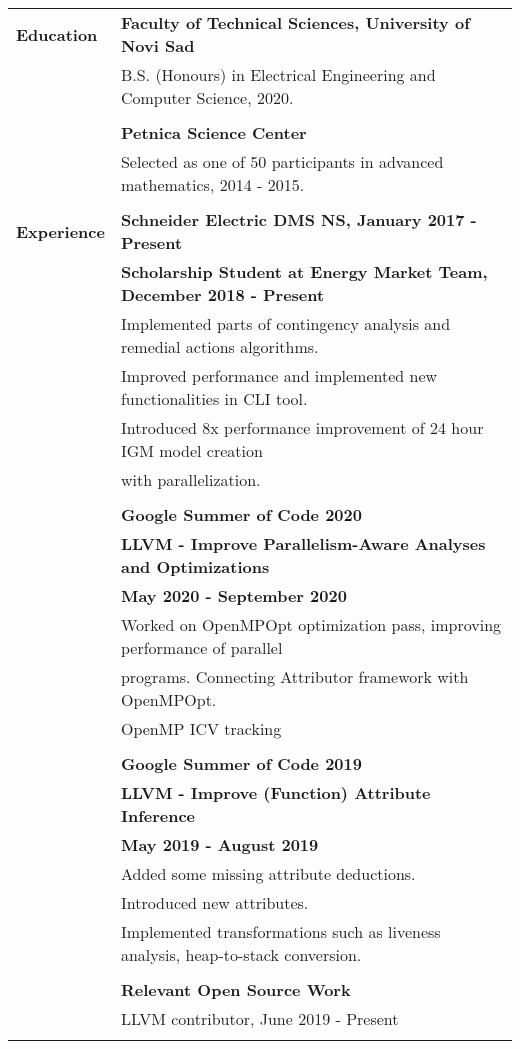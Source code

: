 \documentclass[letterpaper,11pt,oneside]{article}
\begin{document}
\noindent \begin{tabular}{@{} l l}
 \Large\textbf{Education}     & \textbf{Faculty of Technical Sciences, University of Novi Sad} \\
     & B.S. (Honours) in Electrical Engineering and Computer Science, 2020. \\ \\
     & \textbf{Petnica Science Center } \\
     & Selected as one of 50 participants in advanced mathematics, 2014 - 2015. \\ \\
 
 \Large\textbf{Experience}    & \textbf{Schneider Electric DMS NS, January 2017 - Present} \\
 & \textbf{Scholarship Student at Energy Market Team, December 2018 - Present} \\
     & Implemented parts of contingency analysis and remedial actions algorithms. \\
     & Improved performance and implemented new functionalities in CLI tool. \\
     & Introduced 8x performance improvement of 24 hour IGM model creation \\
     & with parallelization. \\
     & \\
     & \textbf{Google Summer of Code 2020} \\
     & \textbf{LLVM - Improve Parallelism-Aware Analyses and Optimizations } \\
     & \textbf{May 2020 - September 2020} \\
     & Worked on OpenMPOpt optimization pass, improving performance of parallel \\
     & programs. Connecting Attributor framework with OpenMPOpt. \\
     & OpenMP ICV tracking\\
     &\\
     &\textbf{Google Summer of Code 2019} \\
     & \textbf{LLVM - Improve (Function) Attribute Inference } \\
     & \textbf{May 2019 - August 2019} \\
     & Added some missing attribute deductions. \\
     & Introduced new attributes. \\
     & Implemented transformations such as liveness analysis, heap-to-stack conversion. \\
     & \\
     & \textbf{Relevant Open Source Work} \\
     & LLVM contributor, June 2019 - Present \\
     & \\
     

\end{tabular}
\end{document}
